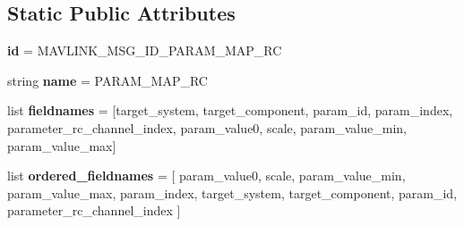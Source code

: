 \subsection*{Static Public Attributes}
\begin{DoxyCompactItemize}
\item 
\mbox{\label{classpymavlink_1_1dialects_1_1v10_1_1MAVLink__param__map__rc__message_a1b0825157df49396dc854698f1b01a0a}} 
{\bfseries id} = M\+A\+V\+L\+I\+N\+K\+\_\+\+M\+S\+G\+\_\+\+I\+D\+\_\+\+P\+A\+R\+A\+M\+\_\+\+M\+A\+P\+\_\+\+RC
\item 
\mbox{\label{classpymavlink_1_1dialects_1_1v10_1_1MAVLink__param__map__rc__message_aaa7f0969d6200c1999f4698bf663dbd9}} 
string {\bfseries name} = \textquotesingle{}P\+A\+R\+A\+M\+\_\+\+M\+A\+P\+\_\+\+RC\textquotesingle{}
\item 
\mbox{\label{classpymavlink_1_1dialects_1_1v10_1_1MAVLink__param__map__rc__message_a2968c8df0508fdf478d6579dbf0f9beb}} 
list {\bfseries fieldnames} = \mbox{[}\textquotesingle{}target\+\_\+system\textquotesingle{}, \textquotesingle{}target\+\_\+component\textquotesingle{}, \textquotesingle{}param\+\_\+id\textquotesingle{}, \textquotesingle{}param\+\_\+index\textquotesingle{}, \textquotesingle{}parameter\+\_\+rc\+\_\+channel\+\_\+index\textquotesingle{}, \textquotesingle{}param\+\_\+value0\textquotesingle{}, \textquotesingle{}scale\textquotesingle{}, \textquotesingle{}param\+\_\+value\+\_\+min\textquotesingle{}, \textquotesingle{}param\+\_\+value\+\_\+max\textquotesingle{}\mbox{]}
\item 
\mbox{\label{classpymavlink_1_1dialects_1_1v10_1_1MAVLink__param__map__rc__message_a7a5d9fb78a040f733e91ac6307681888}} 
list {\bfseries ordered\+\_\+fieldnames} = \mbox{[} \textquotesingle{}param\+\_\+value0\textquotesingle{}, \textquotesingle{}scale\textquotesingle{}, \textquotesingle{}param\+\_\+value\+\_\+min\textquotesingle{}, \textquotesingle{}param\+\_\+value\+\_\+max\textquotesingle{}, \textquotesingle{}param\+\_\+index\textquotesingle{}, \textquotesingle{}target\+\_\+system\textquotesingle{}, \textquotesingle{}target\+\_\+component\textquotesingle{}, \textquotesingle{}param\+\_\+id\textquotesingle{}, \textquotesingle{}parameter\+\_\+rc\+\_\+channel\+\_\+index\textquotesingle{} \mbox{]}

\end{DoxyCompactItemize}
